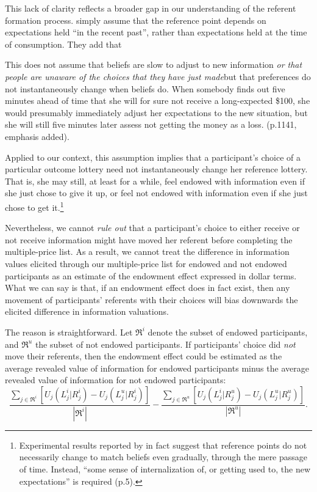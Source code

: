 This lack of clarity reflects a broader gap in our understanding of the referent formation process. \citet{koszegiModelReferenceDependentPreferences2006} simply assume that the reference point depends on expectations held \enquote{in the recent past}, rather than expectations held at the time of consumption. They add that
\begin{displayquote}
  This does not assume that beliefs are slow to adjust to new information \emph{or that people are unaware of the choices that they have just made}\textemdash but that preferences do not instantaneously change when beliefs do. When somebody finds out five minutes ahead of time that she will for sure not receive a long-expected \$100, she would presumably immediately adjust her expectations to the new situation, but she will still five minutes later assess not getting the money as a loss. (p.1141, emphasis added).
\end{displayquote}

Applied to our context, this assumption implies that a participant’s choice of a particular outcome lottery need not instantaneously change her reference lottery. That is, she may still, at least for a while, feel endowed with information even if she just chose to give it up, or feel not endowed with information even if she just chose to get it.\footnote{Experimental results reported by \citet{heffetzAreReferencePoints2018} in fact suggest that reference points do not necessarily change to match beliefs even gradually, through the mere passage of time.  Instead, \enquote{some sense of internalization of, or getting used to, the new expectations} is required (p.5).}

Nevertheless, we cannot \emph{rule out} that a participant's choice to either receive or not receive information might have moved her referent before completing the multiple-price list. As a result, we cannot treat the difference in information values elicited through our multiple-price list for endowed and not endowed participants as an estimate of the endowment effect expressed in dollar terms. What we can say is that, if an endowment effect does in fact exist, then any movement of participants' referents with their choices will bias downwards the elicited difference in information valuations.

The reason is straightforward. Let $\Re^i$ denote the subset of endowed participants, and $\Re^u$ the subset of not endowed participants. If participants' choice did \emph{not} move their referents, then the endowment effect could be estimated as the average revealed value of information for endowed participants minus the average revealed value of information for not endowed participants:
\begin{equation*}
  \frac{\sum_{j \in \Re^i}[U_j(L_j^i|R_j^i)-U_j(L_j^u|R_j^i)]}
       {|\Re^i|}
  -
  \frac{\sum_{j \in \Re^u}[U_j(L_j^i|R_j^u)-U_j(L_j^u|R_j^u)]}
      {|\Re^u|}.
\end{equation*}

